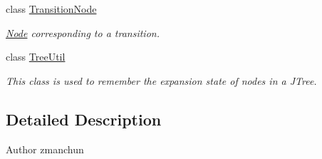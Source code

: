 \begin{DoxyCompactItemize}
class \hyperlink{classedu_1_1udel_1_1cis_1_1vsl_1_1civl_1_1gui_1_1common_1_1TransitionNode}{Transition\+Node}
\begin{DoxyCompactList}\small\item\em \hyperlink{structNode}{Node} corresponding to a transition. \end{DoxyCompactList}\item 
class \hyperlink{classedu_1_1udel_1_1cis_1_1vsl_1_1civl_1_1gui_1_1common_1_1TreeUtil}{Tree\+Util}
\begin{DoxyCompactList}\small\item\em This class is used to remember the expansion state of nodes in a J\+Tree. \end{DoxyCompactList}\end{DoxyCompactItemize}


\subsection{Detailed Description}
\begin{DoxyAuthor}{Author}
zmanchun 
\end{DoxyAuthor}
